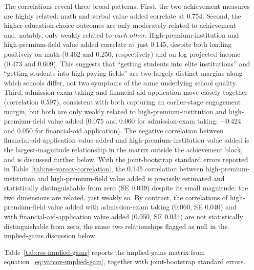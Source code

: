 \documentclass[a4paper, article, english, oneside, unknownkeysallowed, 12pt]{memoir}
\begin{document}
The correlations reveal three broad patterns.
First, the two achievement measures are highly related: math and verbal value added correlate at 0.754.
Second, the higher-education-choice outcomes are only moderately related to achievement and, notably, only weakly related to \emph{each other}.
High-premium-institution and high-premium-field value added correlate at just 0.145, despite both loading positively on math (0.462 and 0.250, respectively) and on log projected income (0.473 and 0.609).
This suggests that ``getting students into elite institutions'' and ``getting students into high-paying fields'' are two largely distinct margins along which schools differ, not two symptoms of the same underlying school quality.
Third, admission-exam taking and financial-aid application move closely together (correlation 0.597), consistent with both capturing an earlier-stage engagement margin, but both are only weakly related to high-premium-institution and high-premium-field value added (0.075 and 0.060 for admission-exam taking; $-0.424$ and 0.050 for financial-aid application).
The negative correlation between financial-aid-application value added and high-premium-institution value added is the largest-magnitude relationship in the matrix outside the achievement block, and is discussed further below.
With the joint-bootstrap standard errors reported in Table~\ref{tab:rss-varcov-correlation}, the 0.145 correlation between high-premium-institution and high-premium-field value added is precisely estimated and statistically distinguishable from zero (SE 0.039) despite its small magnitude: the two dimensions are related, just weakly so.
By contrast, the correlations of high-premium-field value added with admission-exam taking (0.060, SE 0.040) and with financial-aid-application value added (0.050, SE 0.034) are not statistically distinguishable from zero, the same two relationships flagged as null in the implied-gains discussion below.

Table~\ref{tab:rss-implied-gains} reports the implied-gains matrix from equation~\eqref{eq:varcov-implied-gain}, together with joint-bootstrap standard errors.


\end{document}
